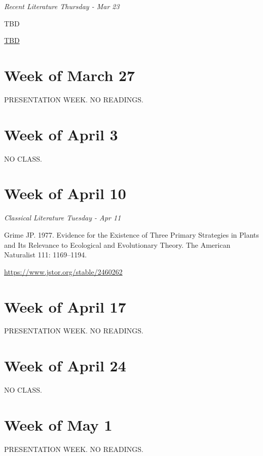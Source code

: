 \documentclass[12pt, notitlepage]{article}   	%
\begin{document}
{\textit{Recent Literature Thursday - Mar 23} \par
TBD \par
\url{TBD}

\section*{Week of March 27}
PRESENTATION WEEK. NO READINGS.

\section*{Week of April 3}
NO CLASS.

\section*{Week of April 10}
\textit{Classical Literature Tuesday - Apr 11} \par
Grime JP. 1977. Evidence for the Existence of Three Primary Strategies in Plants and Its 
Relevance to Ecological and Evolutionary Theory. 
The American Naturalist 111: 1169–1194. \par
\url{https://www.jstor.org/stable/2460262}

\section*{Week of April 17}
PRESENTATION WEEK. NO READINGS.

\section*{Week of April 24}
NO CLASS.

\section*{Week of May 1}
PRESENTATION WEEK. NO READINGS.

} %
\end{document}
